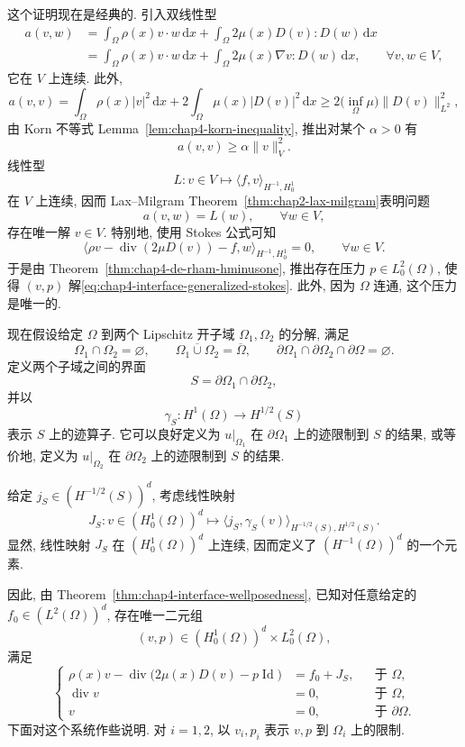 \begin{Proof}
这个证明现在是经典的. 引入双线性型
\begin{align*}
 a(v,w)
 &=\int_\Omega\rho(x)v\cdot w\,\mathrm dx
 +\int_\Omega2\mu(x)D(v):D(w)\,\mathrm dx\\
 &=\int_\Omega\rho(x)v\cdot w\,\mathrm dx
 +\int_\Omega2\mu(x)\nabla v:D(w)\,\mathrm dx,
 \qquad\forall v,w\in V,
\end{align*}
它在 $V$ 上连续. 此外,
\[
 a(v,v)=\int_\Omega\rho(x)|v|^2\,\mathrm dx
 +2\int_\Omega\mu(x)|D(v)|^2\,\mathrm dx
 \geq2\bigl(\inf_\Omega\mu\bigr)\|D(v)\|_{L^2}^2,
\]
由 Korn 不等式 Lemma~\ref{lem:chap4-korn-inequality}, 推出对某个 $\alpha>0$ 有
\[
 a(v,v)\geq\alpha\|v\|_V^2.
\]
线性型
\[
 L:v\in V\longmapsto\langle f,v\rangle_{H^{-1},H_0^1}
\]
在 $V$ 上连续, 因而 Lax--Milgram Theorem~\ref{thm:chap2-lax-milgram}表明问题
\[
 a(v,w)=L(w),\qquad\forall w\in V,
\]
存在唯一解 $v\in V$. 特别地, 使用 Stokes 公式可知
\[
 \bigl\langle\rho v-\operatorname{div}(2\mu D(v))-f,w\bigr\rangle_{H^{-1},H_0^1}=0,
 \qquad\forall w\in V.
\]
于是由 Theorem~\ref{thm:chap4-de-rham-hminusone}, 推出存在压力 $p\in L_0^2(\Omega)$, 使得 $(v,p)$ 解\eqref{eq:chap4-interface-generalized-stokes}. 此外, 因为 $\Omega$ 连通, 这个压力是唯一的.
\end{Proof}

现在假设给定 $\Omega$ 到两个 Lipschitz 开子域 $\Omega_1,\Omega_2$ 的分解, 满足
\[
 \Omega_1\cap\Omega_2=\varnothing,
 \qquad\overline{\Omega_1\cup\Omega_2}=\overline\Omega,
 \qquad\partial\Omega_1\cap\partial\Omega_2\cap\partial\Omega=\varnothing.
\]
定义两个子域之间的界面
\[
 S=\partial\Omega_1\cap\partial\Omega_2,
\]
并以
\[
 \gamma_S:H^1(\Omega)\longrightarrow H^{1/2}(S)
\]
表示 $S$ 上的迹算子. 它可以良好定义为 $u|_{\Omega_1}$ 在 $\partial\Omega_1$ 上的迹限制到 $S$ 的结果, 或等价地, 定义为 $u|_{\Omega_2}$ 在 $\partial\Omega_2$ 上的迹限制到 $S$ 的结果.

给定 $j_S\in(H^{-1/2}(S))^d$, 考虑线性映射
\[
 J_S:v\in(H_0^1(\Omega))^d
 \longmapsto\langle j_S,\gamma_S(v)\rangle_{H^{-1/2}(S),H^{1/2}(S)}.
\]
显然, 线性映射 $J_S$ 在 $(H_0^1(\Omega))^d$ 上连续, 因而定义了 $(H^{-1}(\Omega))^d$ 的一个元素.

因此, 由 Theorem~\ref{thm:chap4-interface-wellposedness}, 已知对任意给定的 $f_0\in(L^2(\Omega))^d$, 存在唯一二元组
\[
 (v,p)\in(H_0^1(\Omega))^d\times L_0^2(\Omega),
\]
满足
\begin{equation}
 \left\{
 \begin{aligned}
  \rho(x)v-\operatorname{div}\bigl(2\mu(x)D(v)-p\operatorname{Id}\bigr)&=f_0+J_S,&&\text{于 }\Omega,\\
  \operatorname{div}v&=0,&&\text{于 }\Omega,\\
  v&=0,&&\text{于 }\partial\Omega.
 \end{aligned}
 \right.
 \label{eq:chap4-interface-stokes-source-jump}
\end{equation}
下面对这个系统作些说明. 对 $i=1,2$, 以 $v_i,p_i$ 表示 $v,p$ 到 $\Omega_i$ 上的限制.

